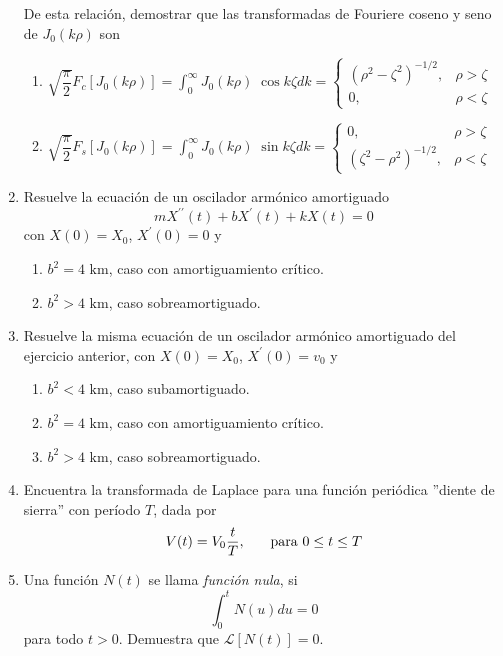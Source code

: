 \begin{enumerate}
De esta relación, demostrar que las transformadas de Fouriere coseno y seno de $J_{0}(k \rho)$ son
\begin{enumerate}[label=\alph*)]
\item $\sqrt{\dfrac{\pi}{2}} F_{c} \left[ J_{0} (k \rho) \right] = \displaystyle  \int_{0}^{\infty} J_{0} (k \rho) \; \cos k \zeta dk
 = \begin{cases}
(\rho^{2} - \zeta^{2})^{-1/2}, & \rho > \zeta \\
0, & \rho < \zeta
\end{cases}$ 
\item $\sqrt{\dfrac{\pi}{2}} F_{s} \left[ J_{0} (k \rho) \right] = \displaystyle  \int_{0}^{\infty} J_{0} (k \rho) \; \sin k \zeta dk
 = \begin{cases}
0, & \rho > \zeta \\
(\zeta^{2} - \rho^{2})^{-1/2}, & \rho < \zeta
\end{cases}$ 
 \end{enumerate}
\item Resuelve la ecuación de un oscilador armónico amortiguado 
\[ m X^{\prime \prime} (t) + b X^{\prime}(t) + k X(t) = 0 \]
con $X(0) = X_{0}$, $X^{\prime}(0) = 0$ y
\begin{enumerate}[label=\alph*)]
\item $b^{2} = 4 \mbox{ km}$, caso con amortiguamiento crítico.
\item $b^{2} > 4 \mbox{ km}$, caso sobreamortiguado.
\end{enumerate}
\item Resuelve la misma ecuación de un oscilador armónico amortiguado del ejercicio anterior, con $X(0) = X_{0}$, $X^{\prime}(0) = v_{0}$ y
\begin{enumerate}[label=\alph*)]
\item $b^{2} < 4 \mbox{ km}$, caso subamortiguado.
\item $b^{2} = 4 \mbox{ km}$, caso con amortiguamiento crítico.
\item $b^{2} > 4 \mbox{ km}$, caso sobreamortiguado.
\end{enumerate}
\item Encuentra la transformada de Laplace para una función periódica ''diente de sierra'' con período $T$, dada por
\[ V(t) = V_{0} \dfrac{t}{T}, \hspace{0.5cm} \mbox{ para } 0 \leq t \leq T \]
\item Una función $N(t)$ se llama \emph{función nula}, si
\[ \int_{0}^{t} N(u) du = 0 \]
para todo $t > 0$. Demuestra que $\mathcal{L} [N(t)] = 0$.

\end{enumerate}
